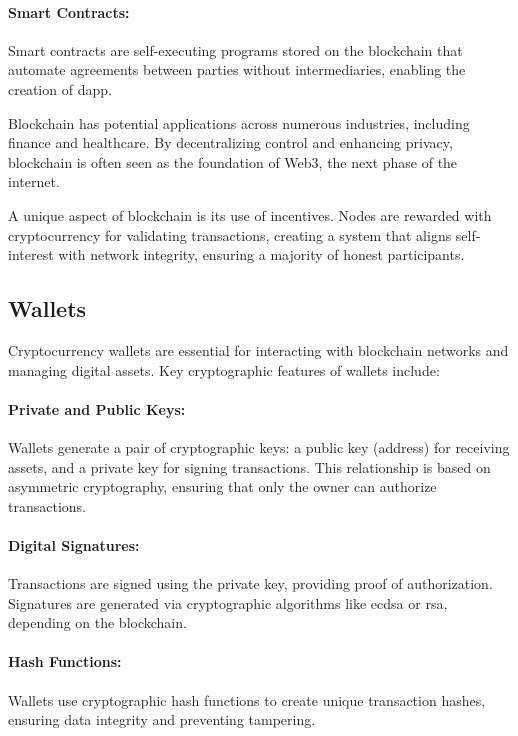 \paragraph{Smart Contracts:}
Smart contracts are self-executing programs stored on the blockchain that
automate agreements between parties without intermediaries, enabling the
creation of \gls{dapp}.

Blockchain has potential applications across numerous industries, including
finance and healthcare. By decentralizing control and enhancing privacy,
blockchain is often seen as the foundation of Web3, the next phase of the
internet.

A unique aspect of blockchain is its use of incentives. Nodes are rewarded with
cryptocurrency for validating transactions, creating a system that aligns
self-interest with network integrity, ensuring a majority of honest
participants.

\subsection{Wallets}
\label{subsec:wallets}

Cryptocurrency wallets are essential for interacting with blockchain networks
and managing digital assets. Key cryptographic features of wallets include:

\paragraph{Private and Public Keys:}
Wallets generate a pair of cryptographic keys: a public key (address) for
receiving assets, and a private key for signing transactions. This relationship
is based on asymmetric cryptography, ensuring that only the owner can authorize
transactions.

\paragraph{Digital Signatures:}
Transactions are signed using the private key, providing proof of
authorization. Signatures are generated via cryptographic algorithms like
\gls{ecdsa} or \gls{rsa}, depending on the blockchain.

\paragraph{Hash Functions:}
Wallets use cryptographic hash functions to create unique transaction hashes,
ensuring data integrity and preventing tampering.

